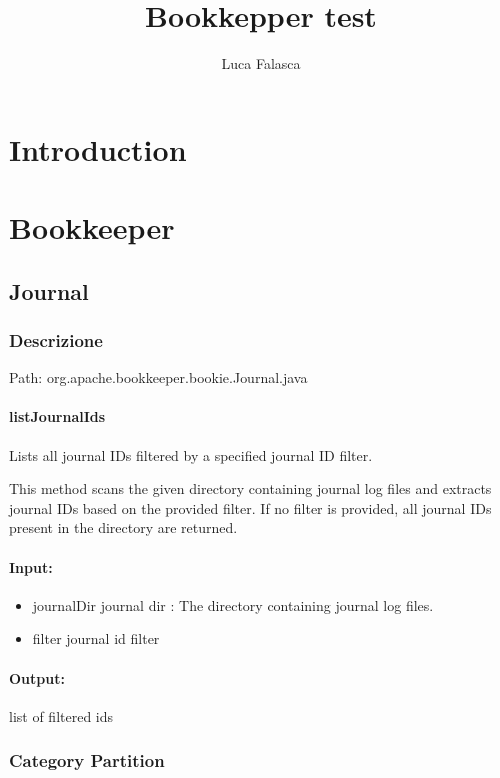 \documentclass[12pt, a4paper]{article}
\title{Bookkepper test}
\author{Luca Falasca}
\begin{document}
\maketitle
\tableofcontents

\listoffigures
\listoftables

\newpage

\section{Introduction}

\section{Bookkeeper}
\subsection{Journal}
\subsubsection{Descrizione}
Path: org.apache.bookkeeper.bookie.Journal.java

\paragraph{listJournalIds}
Lists all journal IDs filtered by a specified journal ID filter.

This method scans the given directory containing journal log files and extracts
journal IDs based on the provided filter. If no filter is provided, all journal
IDs present in the directory are returned.


\paragraph{Input:}
\begin{itemize}
  \item journalDir journal dir : The directory containing journal log files.
  \item filter journal id filter
\end{itemize}
\paragraph{Output:}
    list of filtered ids

\subsubsection{Category Partition}
\end{document}
